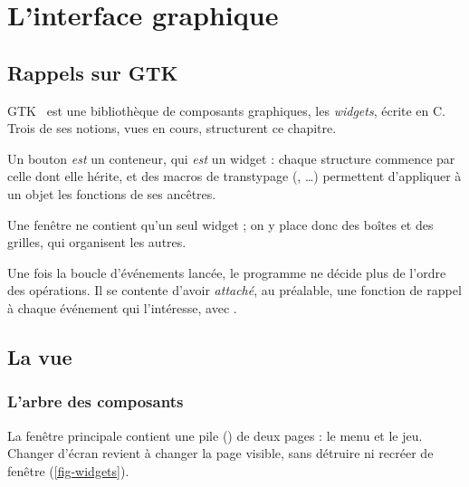 \chapter{L'interface graphique}
\label{chap-interface}

\section{Rappels sur GTK}

GTK~\cite{gtk3} est une bibliothèque de composants graphiques, les \emph{widgets}, écrite
en C. Trois
de ses notions, vues en cours, structurent ce chapitre.

\begin{description}[style=nextline, leftmargin=1.2em]
    \item[Héritage par inclusion] Un bouton \emph{est} un conteneur, qui \emph{est} un
          widget : chaque structure commence par celle dont elle hérite, et des macros de
          transtypage (, \dots) permettent d'appliquer à un
          objet les fonctions de ses ancêtres.
    \item[Conteneurs] Une fenêtre ne contient qu'un seul widget ; on y place donc des boîtes
          et des grilles, qui organisent les autres.
    \item[Programmation événementielle] Une fois la boucle d'événements lancée, le programme
          ne décide plus de l'ordre des opérations. Il se contente d'avoir \emph{attaché}, au
          préalable, une fonction de rappel à chaque événement qui l'intéresse, avec
          .
\end{description}

\section{La vue}

\subsection{L'arbre des composants}

La fenêtre principale contient une pile () de deux pages : le menu et le jeu.
Changer d'écran revient à changer la page visible, sans détruire ni recréer de fenêtre
(\cref{fig-widgets}).

